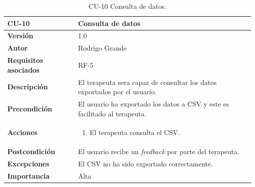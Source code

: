     \begin{table}[p]
	\centering
	\begin{tabularx}{\linewidth}{ p{} p{} }
		\toprule
		\textbf{CU-10} & \textbf{Consulta de datos}\\
		\toprule
		\textbf{Versión}              & 1.0    \\
		\textbf{Autor}                & Rodrigo Grande \\
		\textbf{Requisitos asociados} & RF-5 \\
		\textbf{Descripción}          & El terapeuta sera capaz de consultar los datos exportados por el usuario.\\
		\textbf{Precondición}         & El usuario ha exportado los datos a CSV y este es facilitado al terapeuta. \\
		\textbf{Acciones}             &
		\begin{enumerate}
			\def\labelenumi{\arabic{enumi}.}
			\tightlist
			\item El terapeuta consulta el CSV.
		\end{enumerate}\\
		\textbf{Postcondición}        & El usuario recibe un \textit{feedback} por parte del terapeuta. \\
		\textbf{Excepciones}          & El CSV no ha sido exportado correctamente. \\
		\textbf{Importancia}          & Alta \\
		\bottomrule
	\end{tabularx}
	\caption{CU-10 Consulta de datos.}
	\label{cu:realizar-sesion-palacio-shahriar}
\end{table}
